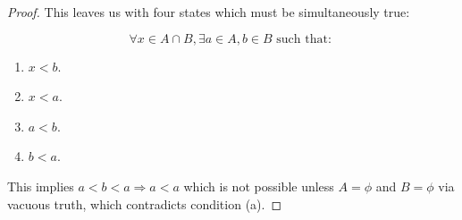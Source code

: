 \documentclass[12pt, a4paper]{article}
\begin{document}
\begin{proof}
    This leaves us with four states which must be simultaneously true:

    \[
        \forall x \in A \cap B, \exists a \in A, b \in B \text{ such that: }
    \]
    \begin{enumerate}
        \item $x < b$.
        \item $x < a$.
        \item $a < b$.
        \item $b < a$.
    \end{enumerate}
    This implies $a < b < a \Rightarrow a < a$ which is not possible unless $A = \phi$
    and $B = \phi$ via vacuous truth, which contradicts condition (a).
\end{proof}
\end{document}
